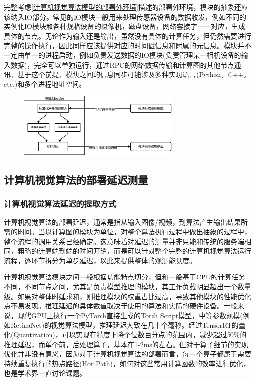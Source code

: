 \documentclass[master]{shtthesis}
\begin{document}
完整考虑\ref{计算机视觉算法模型的部署外环境}描述的部署外环境，模块的抽象还应该纳入IO部分。常见的IO模块一般用来处理传感器设备的数据收发，例如不同的实例化IO模块和各种规格设备的摄像机，磁盘设备，网络套接字一一对应，生成具体的节点。无论作为输入还是输出，虽然没有具体的计算任务，但仍然需要进行完整的操作执行，因此同样应该提供对应的时间戳信息和附属的元信息。模块并不一定由单一的进程启动，例如负责发送数据的IO模块(负责管理某一相机设备的输入数据)，完全可以单独运行，通过RPC的网络数据传输和计算图的其他节点通讯，基于这个前提，模块之间的信息同步可能涉及多种实现语言(Python，C++，etc.)和多个进程地址空间。

\begin{figure}[htbp]
	\centering
	\includegraphics[width=8cm]{img/module.pdf}
	\label{模块的基本结构}
\end{figure}


\subsection{计算机视觉算法的部署延迟测量}\label{lantms}
\subsubsection{计算机视觉算法延迟的提取方式}\label{计算机视觉算法延迟的提取方式}
计算机视觉算法的部署延迟，通常是指从输入图像/视频，到算法产生输出结果所需的时间。当以计算图的模块为单位，对整个算法执行过程中做出抽象的过程中，整个流程的调用关系已经确定。这意味着对延迟的测量并非只能和传统的服务端相同，粗略的计算端到端的时间开销，而是可以针对整个完整的计算机视觉算法运行流程，逐环节拆分为单步延迟，以此来提供整体的观测能见度。

计算机视觉算法模块之间一般根据功能特点切分，但和一般基于CPU的计算任务不同，不同节点之间，尤其是负责模型推理的模块，其工作负载明显超出一个数量级。如果对整体时延求和，则推理模块的权重占比过高，导致其他模块的性能优化点不易发现。推理延迟的具体数值取决于使用的算法和实际的硬件设备。一般来说，现代GPU上执行一个PyTorch直接生成的Torch Script模型，中等参数规模(例如RetinaNet\cite{lin2017focal})的视觉算法模型，推理延迟大致在几十个毫秒。经过TensorRT的量化(Quantization)，可以实现在精度下降个位数百分点的范围内，减少超过50$\%$的推理延迟，而单个前，后处理算子，基本在1-2ms的左右。但对于算子细节的实现优化并非没有意义，因为对于计算机视觉算法的部署而言，每一个算子都属于需要持续重复执行的热点路径(Hot Path)，如何对这些常用计算函数的效率进行优化，也是学术界一直讨论课题\cite{cai2019maxpoolnms}。
\end{document}
